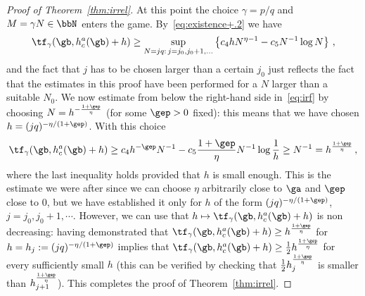 \begin{proof}[Proof of Theorem~\ref{thm:irrel}]
At this point the choice $\gamma=p/q$ and $M=\gamma N \in \bbN$ enters the game. By~\eqref{eq:existence+.2} we have
\begin{equation}\label{eq:irf}
\tf_{\gamma}(\gb,h_c^a(\gb) +h) \geq \sup_{N=jq :\,j =j_0, j_0+1, \ldots} \left\{ c_4 h N^{\eta-1} - c_5 N^{-1} \log N \right\}\,,
\end{equation}
and the fact that $j$ has to be chosen larger than a certain $j_0$ just reflects the fact that the estimates in this proof have been performed for a $N$ larger than a suitable $N_0$. We now estimate from below the right-hand side in~\eqref{eq:irf} by choosing $N= h^{-\frac{1+\gep}{\eta}}$ (for some $\gep>0$ fixed): this means that we have chosen $h=(jq)^{-\eta/(1+\gep)}$. With this choice
\begin{equation}
\tf_{\gamma}(\gb,h_c^a(\gb) +h) \geq c_4 h^{-\gep} N^{-1} - c_5 \frac{1+\gep}{\eta} N^{-1} \log \frac 1h \geq N^{-1} = h^{\frac{1+\gep}{\eta}}\,,
\end{equation}
where the last inequality holds provided that $h$ is small enough. This is the estimate we were after since we can choose $\eta$ arbitrarily close to $\ga$ and $\gep$ close to $0$, but we have established it only for $h$ of the form $(jq)^{-\eta/(1+\gep)}$, $j=j_0, j_0+1, \cdots$. However, we can use that $h\mapsto \tf_{\gamma}(\gb,h_c^a(\gb) +h)$ is non decreasing: having demonstrated that $\tf_{\gamma}(\gb,h_c^a(\gb) +h)\ge h^{\frac{1+\gep}{\eta}}$ for $h=h_j:=(jq)^{-\eta/(1+\gep)}$ implies that $\tf_{\gamma}(\gb,h_c^a(\gb) +h)\ge \tfrac12 h^{\frac{1+\gep}{\eta}}$ for every sufficiently small $h$ (this can be verified by checking that $\tfrac12 h_j^{\frac{1+\gep}{\eta}}$ is smaller than $h_{j+1}^{\frac{1+\gep}{\eta}}$). This completes the proof of Theorem~\ref{thm:irrel}.
\end{proof}
